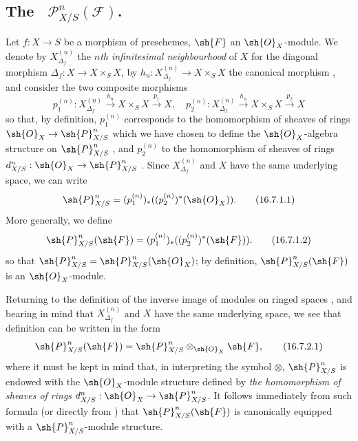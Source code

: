 \subsection{The ~$\mathcal{P}_{X/S}^n(\mathcal{F})$.}
\label{IV.16.7}

\begin{env}[16.7.1]
\label{IV.16.7.1}
Let $f:X \to S$ be a morphism of preschemes, $\sh{F}$ an $\sh{O}_X$-module.
We denote by $X_{\Delta_f}^{(n)}$ the \emph{$n$th infinitesimal neighbourhood} of $X$ for the diagonal morphism
$\Delta_f: X \to X \times_S X$, by $h_n:X_{\Delta_f}^{(n)} \to X \times_S X$ the canonical morphism , and consider the two composite morphisms
\[
  p_1^{(n)}:X_{\Delta_f}^{(n)} \xrightarrow{h_n} X \times_S X \xrightarrow{p_1} X, \quad 
  p_2^{(n)}:X_{\Delta_f}^{(n)} \xrightarrow{h_n} X \times_S X \xrightarrow{p_2} X
\]
so that, by definition, $p_1^{(n)}$ corresponds to the homomorphism of sheaves of rings $\sh{O}_X \to \sh{P}_{X/S}^n$ which we have chosen to define the $\sh{O}_X$-algebra structure on $\sh{P}_{X/S}^n$ , and $p_2^{(n)}$ to the homomorphism of sheaves of rings $d^n_{X/S}:\sh{O}_X \to \sh{P}_{X/S}^n$ .
Since $X_{\Delta_f}^{(n)}$ and $X$ have the same underlying space, we can write
\[
  \label{IV.16.7.1.1}
  \sh{P}_{X/S}^n = (p_1^{(n)})_* ((p_2^{(n)})^* (\sh{O}_X)).
  \tag{16.7.1.1}
\]
More generally, we define
\[
  \label{IV.16.7.1.2}
  \sh{P}_{X/S}^n(\sh{F}) = (p_1^{(n)})_* ((p_2^{(n)})^* (\sh{F})).
  \tag{16.7.1.2}
\]
so that $\sh{P}_{X/S}^n = \sh{P}_{X/S}^n(\sh{O}_X)$;
by definition, $\sh{P}_{X/S}^n(\sh{F})$ is an $\sh{O}_X$-module.
\end{env}

\begin{env}[16.7.2]
\label{IV.16.7.2}
Returning to the definition of the inverse image of modules on ringed spaces , and bearing in mind that $X_{\Delta_f}^{(n)}$ and $X$ have the same underlying space, we see that definition  can be written in the form
\[
  \label{IV.16.7.2.1}
  \sh{P}_{X/S}^n(\sh{F}) = \sh{P}_{X/S}^n \otimes_{\sh{O}_X} \sh{F},
  \tag{16.7.2.1}
\]
where it must be kept in mind that, in interpreting the symbol $\otimes$, $\sh{P}_{X/S}^n$ is endowed with the $\sh{O}_X$-module structure defined by \emph{the homomorphism of sheaves of rings $d_{X/S}^n:\sh{O}_X \to \sh{P}_{X/S}^n$}.
It follows immediately from such formula (or directly from ) that $\sh{P}_{X/S}^n(\sh{F})$ is canonically equipped with a $\sh{P}_{X/S}^n$-module structure. 
\end{env}

